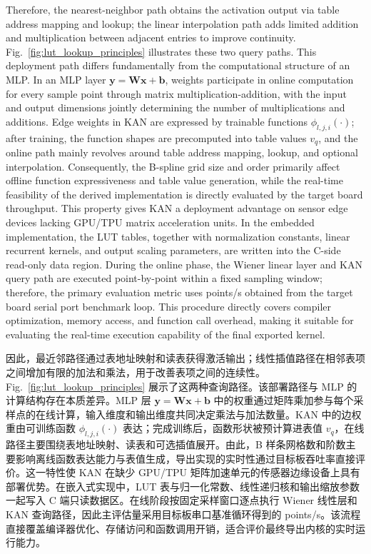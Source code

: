 \documentclass[sn-nature]{sn-jnl}
\newif\ifCNENEnglish
\newif\ifCNENBilingual
\newcommand{\CNEN}[2]{%
    \ifCNENBilingual
        #1%
        \if\relax\detokenize{#2}\relax\else\par #2\fi%
    \else
        \ifCNENEnglish
            #2%
        \else
            #1%
        \fi
    \fi
}
\begin{document}
\CNEN{因此，最近邻路径通过表地址映射和读表获得激活输出；线性插值路径在相邻表项之间增加有限的加法和乘法，用于改善表项之间的连续性。Fig.~\ref{fig:lut_lookup_principles} 展示了这两种查询路径。该部署路径与 MLP 的计算结构存在本质差异。MLP 层 $\mathbf{y}=\mathbf{W}\mathbf{x}+\mathbf{b}$ 中的权重通过矩阵乘加参与每个采样点的在线计算，输入维度和输出维度共同决定乘法与加法数量。KAN 中的边权重由可训练函数 $\phi_{l,j,i}(\cdot)$ 表达；完成训练后，函数形状被预计算进表值 $v_q$，在线路径主要围绕表地址映射、读表和可选插值展开。由此，B 样条网格数和阶数主要影响离线函数表达能力与表值生成，导出实现的实时性通过目标板吞吐率直接评价。这一特性使 KAN 在缺少 GPU/TPU 矩阵加速单元的传感器边缘设备上具有部署优势。在嵌入式实现中，LUT 表与归一化常数、线性递归核和输出缩放参数一起写入 C 端只读数据区。在线阶段按固定采样窗口逐点执行 Wiener 线性层和 KAN 查询路径，因此主评估量采用目标板串口基准循环得到的 points/s。该流程直接覆盖编译器优化、存储访问和函数调用开销，适合评价最终导出内核的实时运行能力。}{Therefore, the nearest-neighbor path obtains the activation output via table address mapping and lookup; the linear interpolation path adds limited addition and multiplication between adjacent entries to improve continuity. Fig.~\ref{fig:lut_lookup_principles} illustrates these two query paths. This deployment path differs fundamentally from the computational structure of an MLP. In an MLP layer $\mathbf{y}=\mathbf{W}\mathbf{x}+\mathbf{b}$, weights participate in online computation for every sample point through matrix multiplication-addition, with the input and output dimensions jointly determining the number of multiplications and additions. Edge weights in KAN are expressed by trainable functions $\phi_{l,j,i}(\cdot)$; after training, the function shapes are precomputed into table values $v_q$, and the online path mainly revolves around table address mapping, lookup, and optional interpolation. Consequently, the B-spline grid size and order primarily affect offline function expressiveness and table value generation, while the real-time feasibility of the derived implementation is directly evaluated by the target board throughput. This property gives KAN a deployment advantage on sensor edge devices lacking GPU/TPU matrix acceleration units. In the embedded implementation, the LUT tables, together with normalization constants, linear recurrent kernels, and output scaling parameters, are written into the C-side read-only data region. During the online phase, the Wiener linear layer and KAN query path are executed point-by-point within a fixed sampling window; therefore, the primary evaluation metric uses points/s obtained from the target board serial port benchmark loop. This procedure directly covers compiler optimization, memory access, and function call overhead, making it suitable for evaluating the real-time execution capability of the final exported kernel.%
}\FloatBarrier
\end{document}
